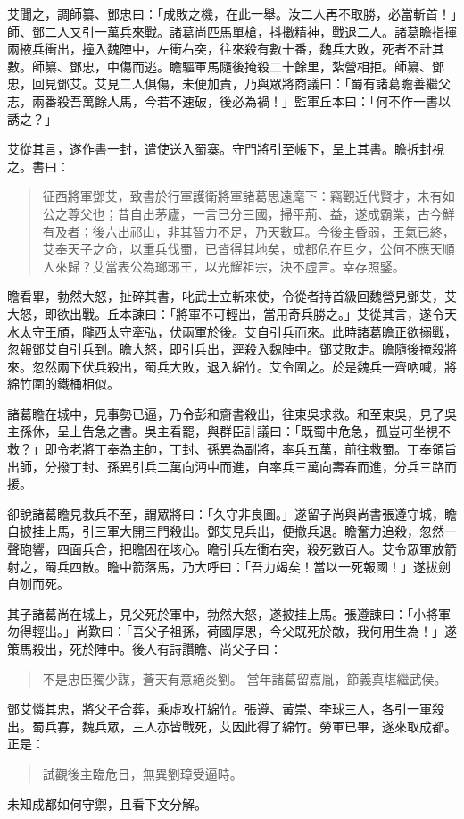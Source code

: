 艾聞之，調師纂、鄧忠曰：「成敗之機，在此一舉。汝二人再不取勝，必當斬首！」師、鄧二人又引一萬兵來戰。諸葛尚匹馬單槍，抖擻精神，戰退二人。諸葛瞻指揮兩掖兵衝出，撞入魏陣中，左衝右突，往來殺有數十番，魏兵大敗，死者不計其數。師纂、鄧忠，中傷而逃。瞻驅軍馬隨後掩殺二十餘里，紮營相拒。師纂、鄧忠，回見鄧艾。艾見二人俱傷，未便加責，乃與眾將商議曰：「蜀有諸葛瞻善繼父志，兩番殺吾萬餘人馬，今若不速破，後必為禍！」監軍丘本曰：「何不作一書以誘之？」

艾從其言，遂作書一封，遣使送入蜀寨。守門將引至帳下，呈上其書。瞻拆封視之。書曰：

\begin{quote}
征西將軍鄧艾，致書於行軍護衛將軍諸葛思遠麾下：竊觀近代賢才，未有如公之尊父也；昔自出茅廬，一言已分三國，掃平荊、益，遂成霸業，古今鮮有及者；後六出祁山，非其智力不足，乃天數耳。今後主昏弱，王氣已終，艾奉天子之命，以重兵伐蜀，已皆得其地矣，成都危在旦夕，公何不應天順人來歸？艾當表公為瑯琊王，以光耀祖宗，決不虛言。幸存照鋻。
\end{quote}

瞻看畢，勃然大怒，扯碎其書，叱武士立斬來使，令從者持首級回魏營見鄧艾，艾大怒，即欲出戰。丘本諫曰：「將軍不可輕出，當用奇兵勝之。」艾從其言，遂令天水太守王頎，隴西太守牽弘，伏兩軍於後。艾自引兵而來。此時諸葛瞻正欲搦戰，忽報鄧艾自引兵到。瞻大怒，即引兵出，逕殺入魏陣中。鄧艾敗走。瞻隨後掩殺將來。忽然兩下伏兵殺出，蜀兵大敗，退入綿竹。艾令圍之。於是魏兵一齊吶喊，將綿竹圍的鐵桶相似。

諸葛瞻在城中，見事勢已逼，乃令彭和齎書殺出，往東吳求救。和至東吳，見了吳主孫休，呈上告急之書。吳主看罷，與群臣計議曰：「既蜀中危急，孤豈可坐視不救？」即令老將丁奉為主帥，丁封、孫異為副將，率兵五萬，前往救蜀。丁奉領旨出師，分撥丁封、孫異引兵二萬向沔中而進，自率兵三萬向壽春而進，分兵三路而援。

卻說諸葛瞻見救兵不至，謂眾將曰：「久守非良圖。」遂留子尚與尚書張遵守城，瞻自披挂上馬，引三軍大開三門殺出。鄧艾見兵出，便撤兵退。瞻奮力追殺，忽然一聲砲響，四面兵合，把瞻困在垓心。瞻引兵左衝右突，殺死數百人。艾令眾軍放箭射之，蜀兵四散。瞻中箭落馬，乃大呼曰：「吾力竭矣！當以一死報國！」遂拔劍自刎而死。

其子諸葛尚在城上，見父死於軍中，勃然大怒，遂披挂上馬。張遵諫曰：「小將軍勿得輕出。」尚歎曰：「吾父子祖孫，荷國厚恩，今父既死於敵，我何用生為！」遂策馬殺出，死於陣中。後人有詩讚瞻、尚父子曰：

\begin{quote}
不是忠臣獨少謀，蒼天有意絕炎劉。
當年諸葛留嘉胤，節義真堪繼武侯。
\end{quote}

鄧艾憐其忠，將父子合葬，乘虛攻打綿竹。張遵、黃崇、李球三人，各引一軍殺出。蜀兵寡，魏兵眾，三人亦皆戰死，艾因此得了綿竹。勞軍已畢，遂來取成都。正是：

\begin{quote}
試觀後主臨危日，無異劉璋受逼時。
\end{quote}

未知成都如何守禦，且看下文分解。
